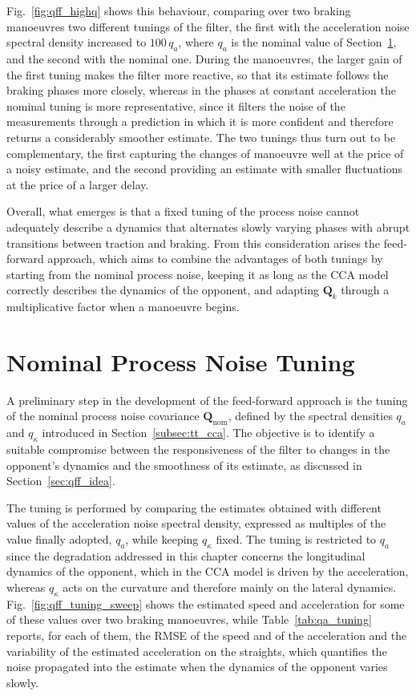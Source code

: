 Fig.~\ref{fig:qff_highq} shows this behaviour, comparing over two braking manoeuvres two
different tunings of the filter, the first with the acceleration noise spectral density increased to $100\,q_a$, where $q_a$ is
the nominal value of Section~\ref{sec:qff_nominal}, and the second with the nominal one. During the manoeuvres, the larger
gain of the first tuning makes the filter more reactive, so that its estimate follows the
braking phases more closely, whereas in the phases at constant acceleration the nominal tuning
is more representative, since it filters the noise of the measurements through a prediction in
which it is more confident and therefore returns a considerably smoother estimate. The two
tunings thus turn out to be complementary, the first capturing the changes of manoeuvre well at
the price of a noisy estimate, and the second providing an estimate with smaller fluctuations at the price of
a larger delay.

Overall, what emerges is that a fixed tuning of the process noise cannot adequately describe a
dynamics that alternates slowly varying phases with abrupt transitions between traction and
braking. From this consideration arises the feed-forward approach, which aims to combine the
advantages of both tunings by starting from the nominal process noise, keeping it as long as
the CCA model correctly describes the dynamics of the opponent, and adapting $\mathbf{Q}_k$
through a multiplicative factor when a manoeuvre begins.

\section{Nominal Process Noise Tuning}
\label{sec:qff_nominal}

A preliminary step in the development of the feed-forward approach is the tuning of the nominal
process noise covariance $\mathbf{Q}_{\mathrm{nom}}$, defined by the spectral densities $q_a$
and $q_\kappa$ introduced in Section~\ref{subsec:tt_cca}. The objective is to identify a
suitable compromise between the responsiveness of the filter to changes in the opponent's
dynamics and the smoothness of its estimate, as discussed in Section~\ref{sec:qff_idea}.

The tuning is performed by comparing the estimates obtained with different values of the
acceleration noise spectral density, expressed as multiples of the value finally adopted, $q_a$,
while keeping $q_\kappa$ fixed. The tuning is restricted to $q_a$ since the degradation addressed
in this chapter concerns the longitudinal dynamics of the opponent, which in the CCA model is
driven by the acceleration, whereas $q_\kappa$ acts on the curvature and therefore mainly on the
lateral dynamics. Fig.~\ref{fig:qff_tuning_sweep} shows the
estimated speed and acceleration for some of these values over two braking manoeuvres, while
Table~\ref{tab:qa_tuning} reports, for each of them, the RMSE of the speed and of the acceleration
and the variability of the estimated acceleration on the straights, which quantifies the noise
propagated into the estimate when the dynamics of the opponent varies slowly.

